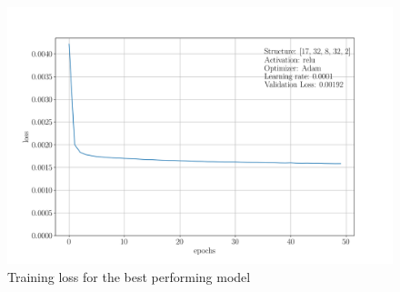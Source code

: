 \begin{figure}[H]
    \centering
    \includegraphics[width=1\linewidth]{training_evolution_best_model.png}  
    \caption{Training loss for the best performing model}
    \label{fig:best_model}
\end{figure}
